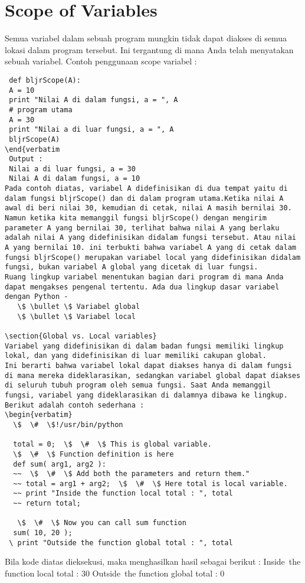 \section{Scope of Variables} 
Semua variabel dalam sebuah program mungkin tidak dapat diakses di semua lokasi dalam program tersebut. Ini tergantung di mana Anda telah menyatakan sebuah variabel. 
Contoh penggunaan scope variabel : 
\begin{verbatim}
 def bljrScope(A):
 A = 10
 print "Nilai A di dalam fungsi, a = ", A
 # program utama
 A = 30
 print "Nilai a di luar fungsi, a = ", A
 bljrScope(A)
\end{verbatim
 Output :
 Nilai a di luar fungsi, a = 30
 Nilai A di dalam fungsi, a = 10
Pada contoh diatas, variabel A didefinisikan di dua tempat yaitu di dalam fungsi bljrScope() dan di dalam program utama.Ketika nilai A awal di beri nilai 30, kemudian di cetak, nilai A masih bernilai 30. Namun ketika kita memanggil fungsi bljrScope() dengan mengirim parameter A yang bernilai 30, terlihat bahwa nilai A yang berlaku adalah nilai A yang didefinisikan didalam fungsi tersebut. Atau nilai A yang bernilai 10. ini terbukti bahwa variabel A yang di cetak dalam fungsi bljrScope() merupakan variabel local yang didefinisikan didalam fungsi, bukan variabel A global yang dicetak di luar fungsi.  
Ruang lingkup variabel menentukan bagian dari program di mana Anda dapat mengakses pengenal tertentu. Ada dua lingkup dasar variabel dengan Python - 
   \$ \bullet \$ Variabel global 
   \$ \bullet \$ Variabel local 

\section{Global vs. Local variables} 
Variabel yang didefinisikan di dalam badan fungsi memiliki lingkup lokal, dan yang didefinisikan di luar memiliki cakupan global. 
Ini berarti bahwa variabel lokal dapat diakses hanya di dalam fungsi di mana mereka dideklarasikan, sedangkan variabel global dapat diakses di seluruh tubuh program oleh semua fungsi. Saat Anda memanggil fungsi, variabel yang dideklarasikan di dalamnya dibawa ke lingkup. Berikut adalah contoh sederhana :
\begin{verbatim}
  \$  \#  \$!/usr/bin/python 

  total = 0;  \$  \#  \$ This is global variable. 
  \$  \#  \$ Function definition is here 
  def sum( arg1, arg2 ): 
  ~~  \$  \#  \$ Add both the parameters and return them." 
  ~~ total = arg1 + arg2;  \$  \#  \$ Here total is local variable. 
  ~~ print "Inside the function local total : ", total 
  ~~ return total; 

   \$  \#  \$ Now you can call sum function 
  sum( 10, 20 ); 
 \ print "Outside the function global total : ", total  
 \end{verbatim}
Bila kode diatas dieksekusi, maka menghasilkan hasil sebagai berikut : 
  Inside~the function local total :  30 
 Outside~the function global total :  0 


